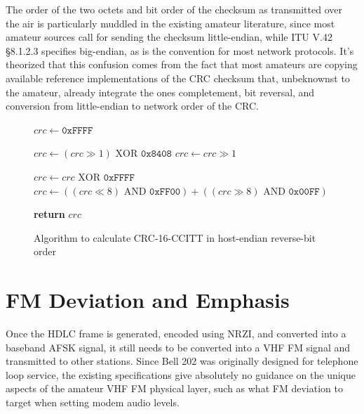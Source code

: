 \documentclass[12pt,letterpaper]{article}
\begin{document}
The order of the two octets and bit order of the checksum 
as transmitted over the air 
is particularly muddled in the existing amateur literature, 
since most amateur sources call for sending the
checksum little-endian, while ITU V.42 \S8.1.2.3 specifies big-endian,
as is the convention for most network protocols.
It's theorized that this confusion comes from the fact that most amateurs are copying
available reference implementations of the CRC checksum that,
unbeknownst to the amateur, already integrate the ones completement,
bit reversal, and conversion from little-endian to network order of the CRC.


\begin{figure}
	\begin{algorithmic}[1]
		\State $crc \gets \texttt{0xFFFF}$

			\State $crc \gets (crc \gg 1) \textrm{ XOR } \texttt{0x8408}$
		\Else
			\State $crc \gets crc \gg 1$
		\EndIf
		\EndFor
		\EndFor

		\State $crc \gets crc \textrm{ XOR } \texttt{0xFFFF}$
		\State $crc \gets ((crc \ll 8) \textrm{ AND } \texttt{0xFF00}) + ((crc \gg 8) \textrm{ AND } \texttt{0x00FF})$

		\State \textbf{return} $crc$
		\EndFunction
	\end{algorithmic}

	\caption{Algorithm to calculate CRC-16-CCITT in host-endian reverse-bit order}
	\label{fig:crcccittcode}
\end{figure}

\section{FM Deviation and Emphasis}

Once the HDLC frame is generated, encoded using NRZI, and converted into
a baseband AFSK signal, it still needs to be converted into a VHF FM signal
and transmitted to other stations. 
Since Bell 202 was originally designed for telephone loop service, 
the existing specifications give absolutely no guidance on the unique 
aspects of the amateur VHF FM physical layer, such as what 
FM deviation to target when setting modem audio levels.
\end{document}
